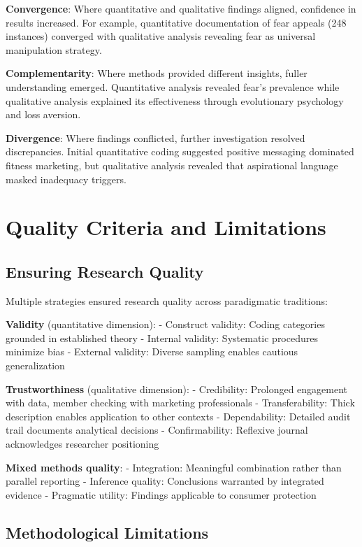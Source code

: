 \textbf{Convergence}: Where quantitative and qualitative findings aligned, confidence in results increased. For example, quantitative documentation of fear appeals (248 instances) converged with qualitative analysis revealing fear as universal manipulation strategy.

\textbf{Complementarity}: Where methods provided different insights, fuller understanding emerged. Quantitative analysis revealed fear's prevalence while qualitative analysis explained its effectiveness through evolutionary psychology and loss aversion.

\textbf{Divergence}: Where findings conflicted, further investigation resolved discrepancies. Initial quantitative coding suggested positive messaging dominated fitness marketing, but qualitative analysis revealed that aspirational language masked inadequacy triggers.

\section{Quality Criteria and Limitations}
\label{sec:quality}

\subsection{Ensuring Research Quality}

Multiple strategies ensured research quality across paradigmatic traditions:

\textbf{Validity} (quantitative dimension):
- Construct validity: Coding categories grounded in established theory
- Internal validity: Systematic procedures minimize bias
- External validity: Diverse sampling enables cautious generalization

\textbf{Trustworthiness} (qualitative dimension):
- Credibility: Prolonged engagement with data, member checking with marketing professionals
- Transferability: Thick description enables application to other contexts
- Dependability: Detailed audit trail documents analytical decisions
- Confirmability: Reflexive journal acknowledges researcher positioning

\textbf{Mixed methods quality}:
- Integration: Meaningful combination rather than parallel reporting
- Inference quality: Conclusions warranted by integrated evidence
- Pragmatic utility: Findings applicable to consumer protection

\subsection{Methodological Limitations}

